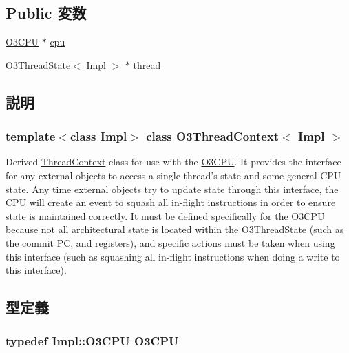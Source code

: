 \subsection*{Public 変数}
\begin{DoxyCompactItemize}
\item 
\hyperlink{classO3ThreadContext_a44622cf06940413482836cb62931ac3f}{O3CPU} $\ast$ \hyperlink{classO3ThreadContext_a1379cf882a12ac6fc9eba5da7c84b18b}{cpu}
\item 
\hyperlink{structO3ThreadState}{O3ThreadState}$<$ Impl $>$ $\ast$ \hyperlink{classO3ThreadContext_a8d3f7115b9c51d0f6160b2f28911c4e3}{thread}
\end{DoxyCompactItemize}


\subsection{説明}
\subsubsection*{template$<$class Impl$>$ class O3ThreadContext$<$ Impl $>$}

Derived \hyperlink{classThreadContext}{ThreadContext} class for use with the \hyperlink{namespaceO3CPU}{O3CPU}. It provides the interface for any external objects to access a single thread's state and some general CPU state. Any time external objects try to update state through this interface, the CPU will create an event to squash all in-\/flight instructions in order to ensure state is maintained correctly. It must be defined specifically for the \hyperlink{namespaceO3CPU}{O3CPU} because not all architectural state is located within the \hyperlink{structO3ThreadState}{O3ThreadState} (such as the commit PC, and registers), and specific actions must be taken when using this interface (such as squashing all in-\/flight instructions when doing a write to this interface). 

\subsection{型定義}
\hypertarget{classO3ThreadContext_a44622cf06940413482836cb62931ac3f}{
\subsubsection[{O3CPU}]{\setlength{\rightskip}{0pt plus 5cm}typedef Impl::O3CPU {\bf O3CPU}}}
\label{classO3ThreadContext_a44622cf06940413482836cb62931ac3f}


